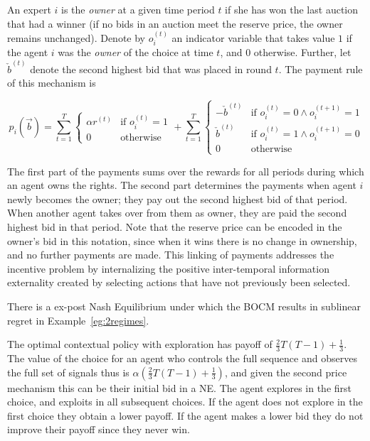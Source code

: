 \begin{mech}
An expert $i$ is the \emph{owner} at a given time period $t$ if she has won the last auction that had a winner (if no bids in an auction meet the reserve price, the owner remains unchanged).
   Denote by $o^{(t)}_{i}$ an indicator variable that takes value $1$ if the agent $i$ was the \emph{owner} of the choice at time $t$, and $0$ otherwise. Further, let $\check b^{(t)}$ denote the second highest bid that was placed in round $t$. The payment rule of this mechanism is

\[
   p_i(\vec b) =  \sum_{t=1}^T
\begin{cases}
    \alpha r^{(t)} & \text{if } o^{(t)}_{i} = 1\\
    0              & \text{otherwise}
\end{cases}
+
   \sum_{t=1}^T
\begin{cases}
     - \check b^{(t)} & \text{if } o^{(t)}_{i} = 0 \land o^{(t+1)}_{i} = 1\\
      \check b^{(t)} & \text{if } o^{(t)}_{i}= 1 \land o^{(t+1)}_{i} = 0 \\
		0              & \text{otherwise}
\end{cases}
\]

\end{mech}


The first part of the payments sums over the rewards for all periods during which an agent owns the rights.
The second part determines the payments when agent $i$ newly becomes the owner; they pay out the second highest bid of that period. 
When another agent takes over from them as owner, they are paid the second highest bid in that period.
Note that the reserve price can be encoded in the owner's bid in this notation, since when it wins there is no change in ownership, and no further payments are made. 
This linking of payments addresses the incentive problem by internalizing the positive inter-temporal information externality created by selecting actions that have not previously been selected.


\begin{prop}
There is a ex-post Nash Equilibrium under which the BOCM results in sublinear regret in Example~\ref{eg:2regimes}. 
\end{prop}

The optimal contextual policy with exploration has payoff of $\frac{2}{3}T(T-1) + \frac{1}{3}$. The value of the choice for an agent who controls the full sequence and observes the full set of signals thus is $\alpha (\frac{2}{3}T(T-1) + \frac{1}{3})$, and given the second price mechanism this can be their initial bid in a NE.
The agent explores in the first choice, and exploits in all subsequent choices. If the agent does not explore in the first choice they obtain a lower payoff. If the agent makes a lower bid they do not improve their payoff since they never win.


